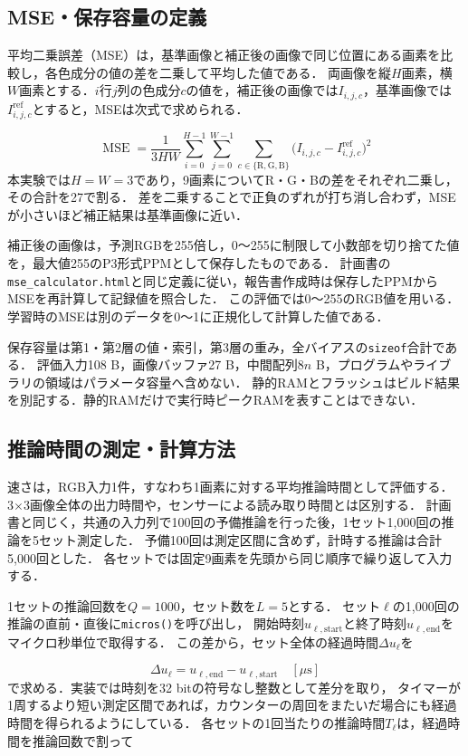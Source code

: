 \documentclass[a4paper,11pt]{article}
\newcommand{\code}[1]{\nolinkurl{#1}}
\begin{document}
\subsection{MSE・保存容量の定義}

平均二乗誤差（MSE）は，基準画像と補正後の画像で同じ位置にある画素を比較し，各色成分の値の差を二乗して平均した値である．
両画像を縦$H$画素，横$W$画素とする．$i$行$j$列の色成分$c$の値を，補正後の画像では$I_{i,j,c}$，基準画像では$I^{\mathrm{ref}}_{i,j,c}$とすると，MSEは次式で求められる．

\[
    \operatorname{MSE}=\frac{1}{3HW}\sum_{i=0}^{H-1}\sum_{j=0}^{W-1}
    \sum_{c\in\{\mathrm{R},\mathrm{G},\mathrm{B}\}}
    \bigl(I_{i,j,c}-I^{\mathrm{ref}}_{i,j,c}\bigr)^2
\]
%
本実験では$H=W=3$であり，9画素についてR・G・Bの差をそれぞれ二乗し，その合計を27で割る．
差を二乗することで正負のずれが打ち消し合わず，MSEが小さいほど補正結果は基準画像に近い．

補正後の画像は，予測RGBを255倍し，0〜255に制限して小数部を切り捨てた値を，最大値255のP3形式PPMとして保存したものである．
計画書の\code{mse_calculator.html}と同じ定義に従い，報告書作成時は保存したPPMからMSEを再計算して記録値を照合した．
この評価では0〜255のRGB値を用いる．学習時のMSEは別のデータを0〜1に正規化して計算した値である．

保存容量は第1・第2層の値・索引，第3層の重み，全バイアスの\code{sizeof}合計である．
評価入力108 B，画像バッファ27 B，中間配列$8n$ B，プログラムやライブラリの領域はパラメータ容量へ含めない．
静的RAMとフラッシュはビルド結果を別記する．静的RAMだけで実行時ピークRAMを表すことはできない．
\subsection{推論時間の測定・計算方法}\label{sec:timing-method}
速さは，RGB入力1件，すなわち1画素に対する平均推論時間として評価する．
3$\times$3画像全体の出力時間や，センサーによる読み取り時間とは区別する．
計画書と同じく，共通の入力列で100回の予備推論を行った後，1セット1,000回の推論を5セット測定した．
予備100回は測定区間に含めず，計時する推論は合計5,000回とした．
各セットでは固定9画素を先頭から同じ順序で繰り返して入力する．

1セットの推論回数を$Q=1000$，セット数を$L=5$とする．
セット$\ell$の1,000回の推論の直前・直後に\code{micros()}\cite{micros}を呼び出し，
開始時刻$u_{\ell,\mathrm{start}}$と終了時刻$u_{\ell,\mathrm{end}}$をマイクロ秒単位で取得する．
この差から，セット全体の経過時間$\Delta u_\ell$を

\[
    \Delta u_\ell=u_{\ell,\mathrm{end}}-u_{\ell,\mathrm{start}}
    \quad[\mu\mathrm{s}]
\]
%
で求める．実装では時刻を32 bitの符号なし整数として差分を取り，
タイマーが1周するより短い測定区間であれば，カウンターの周回をまたいだ場合にも経過時間を得られるようにしている．
各セットの1回当たりの推論時間$T_\ell$は，経過時間を推論回数で割って
\end{document}

